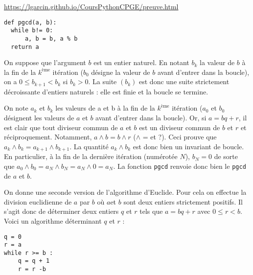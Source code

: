\url{https://lgarcin.github.io/CoursPythonCPGE/preuve.html}

\begin{lstlisting}
def pgcd(a, b):
  while b!= 0:
      a, b = b, a % b
  return a
\end{lstlisting}

\ifprof
\begin{corrige}
On suppose que l'argument $b$ est un entier naturel. En notant $b_k$ la valeur de $b$ à la fin de la $k^\text{ème}$ itération ($b_0$ désigne la valeur de $b$ avant d'entrer dans la boucle), on a $0\leq b_{k+1}<b_k$ si $b_k>0$. La suite $(b_k)$ est donc une suite strictement décroissante d'entiers naturels : elle est finie et la boucle se termine.
\end{corrige}
\else
\fi


\ifprof
\begin{corrige}
On note $a_k$ et $b_k$ les valeurs de a et b à la fin de la $k^\text{ème}$ itération ($a_0$ et $b_0$ désignent les valeurs de $a$ et $b$ avant d'entrer dans la boucle). Or, si $a=bq+r$, il est clair que tout diviseur commun de $a$ et $b$ est un diviseur commun de $b$ et $r$ et réciproquement. Notamment, $a\wedge b=b\wedge r$ ($\wedge$ = et ?). Ceci prouve que $a_k\wedge b_k=a_{k+1}\wedge b_{k+1}$. La quantité $a_k\wedge b_k$ est donc bien un invariant de boucle. En particulier, à la fin de la dernière itération (numérotée $N$), $b_N=0$ de sorte que $a_0\wedge b_0=a_N\wedge b_N=a_N\wedge0=a_N$. La fonction \texttt{pgcd} renvoie donc bien le \texttt{pgcd} de $a$ et $b$.
\end{corrige}
\else
\fi



On donne une seconde version de l'algorithme d'Euclide. Pour cela on effectue la division euclidienne de $a$ par $b$ où $a $et $b$ sont deux entiers strictement positifs. Il s’agit
donc de déterminer deux entiers $q$ et $r$ tels que $a = bq+r$ avec $0 \leq r < b$. Voici un algorithme déterminant
$q$ et $r$ :

\begin{lstlisting}
q = 0
r = a
while r >= b :
    q = q + 1
    r = r -b
\end{lstlisting}

